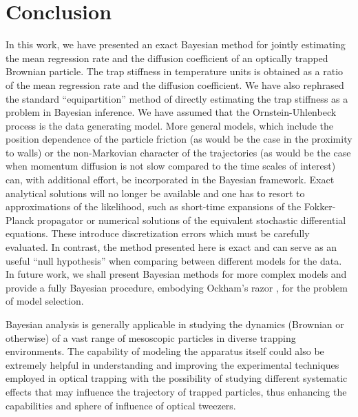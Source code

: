 \documentclass[english,aps, twocolumn, pre,superscriptaddress]{revtex4-1}
\begin{document}
\section{Conclusion\label{sec:Conclusion}}

In this work, we have presented an exact Bayesian method for jointly
estimating the mean regression rate and the diffusion coefficient
of an optically trapped Brownian particle. The trap stiffness in temperature
units is obtained as a ratio of the mean regression rate and the diffusion
coefficient. We have also rephrased the standard ``equipartition''
method of directly estimating the trap stiffness as a problem in Bayesian
inference. We have assumed that the Ornstein-Uhlenbeck process is
the data generating model. More general models, which include the
position dependence of the particle friction (as would be the case
in the proximity to walls) or the non-Markovian character of the trajectories
(as would be the case when momentum diffusion is not slow compared
to the time scales of interest) can, with additional effort, be incorporated
in the Bayesian framework. Exact analytical solutions will no longer
be available and one has to resort to approximations of the likelihood,
such as short-time expansions of the Fokker-Planck propagator or numerical
solutions of the equivalent stochastic differential equations. These
introduce discretization errors which must be carefully evaluated.
In contrast, the method presented here is exact and can serve as an
useful ``null hypothesis'' when comparing between different models
for the data. In future work, we shall present Bayesian methods for
more complex models and provide a fully Bayesian procedure, embodying
Ockham's razor \cite{jaynes2003probability}, for the problem of model
selection. 

Bayesian analysis is generally applicable in studying the dynamics
(Brownian or otherwise) of a vast range of mesoscopic particles in
diverse trapping environments. The capability of modeling the apparatus
itself could also be extremely helpful in understanding and improving
the experimental techniques employed in optical trapping with the
possibility of studying different systematic effects that may influence
the trajectory of trapped particles, thus enhancing the capabilities
and sphere of influence of optical tweezers.
\end{document}
